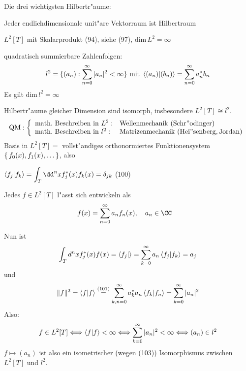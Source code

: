 \documentclass[a4paper]{scrartcl}
\begin{document}
{Die drei wichtigsten Hilbertr"aume:
\begin{1aufz}
\item Jeder endlichdimensionale unit"are Vektorraum ist Hilbertraum
\item $L^2[T]$ mit Skalarprodukt (94), siehe (97), $\mathrm{dim \, } L^2 = \infty$
\item quadratisch summierbare Zahlenfolgen:
\begin{align}
l^2  = \{ (a_n): \sum_{n=0}^\infty \vert a_n \vert^2 < \infty \} \mathrm{ \ mit \ } \braket{ (a_n) | (b_n) }   = \sum_{n=0}^\infty a_n^* b_n
\end{align}
Es gilt $\mathrm{dim \,} l^2 = \infty$
\end{1aufz}
Hilbertr"aume gleicher Dimension sind isomorph, insbesondere $L^2[T] \cong l^2$.
$$
\mathrm{QM}: \left\{
\begin{array}{l l}
\mathrm{math. \ Beschreiben \ in \ } L^2: & \mathrm{Wellenmechanik \ (Schr"odinger)} \\
\mathrm{math. \ Beschreiben \ in \ } l^2: & \mathrm{Matrizenmechanik \ (Hei"senberg, Jordan)}
\end{array}
\right.
$$
Basis in $L^2[T] = $ vollst"andiges orthonormiertes Funktionensystem$\set{ f_0(x), f_1(x), \ldots }$, also 
\begin{aaufz}
\item $\displaystyle \braket{ f_j | f_k} = \int_T \dd^nx f_j^*(x) f_k(x) = \delta_{jk}$ \hfill{} (100)
\item Jedes $f \in L^2[T]$ l"asst sich entwickeln als
\setcounter{equation}{100}
\begin{align}
f(x) & = \sum_{n=0}^\infty a_n f_n(x), \quad a_n \in \CC
\end{align}
\end{aaufz}
Nun ist
\begin{align}
\int_T d^n x f_j^*(x) f(x) = \braket{ f_j | } = \sum_{k=0}^\infty a_n \braket{ f_j | f_k } = a_j
\end{align}
und 
\begin{align}
\Vert f \Vert^2 = \braket{ f | f} \stackrel{(101)}= \sum_{k,n=0}^\infty a_k^* a_n \braket{ f_k | f_n} = \sum_{k=0}^\infty \vert a_n \vert^2
\end{align}
Also:
$$f \in L^2[T] \Longleftrightarrow \braket{ f|f} < \infty \Longleftrightarrow \sum_{k=0}^\infty \vert a_n \vert^2 < \infty \Longleftrightarrow (a_n) \in l^2$$
$f \mapsto (a_n)$ ist also ein isometrischer (wegen (103)) Isomorphismus zwischen $L^2[T]$ und $l^2$.

}
\end{document}
